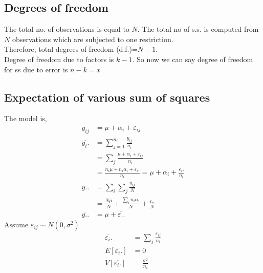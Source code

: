 \documentclass[oneside,11pt,pdftex]{book}%
\numberwithin{equation}{section}
\numberwithin{section}{chapter}
\numberwithin{equation}{chapter}
\begin{document}
\subsection{Degrees of freedom}
The total no. of observations is equal to $ N $. The total no of s.s. is computed from $ N $ observations which are subjected to one restriction.
\\
Therefore, total degrees of freedom (d.f.)=$ N-1 $.\\
Degree of freedom due to factors is $ k-1 $. So now we can say degree of freedom for ss due to error is $ n-k=x $

\subsection{Expectation of various sum of squares}
The model is,
\begin{align*}
	y_{ij}&= \mu + \alpha_i + \varepsilon_{ij}\\
	\overline{y_i.}&= \sum_{j=1}^{n_i}\frac{y_{ij}}{n_i}\\
	&= \sum_j \frac{\mu+\alpha_i + \varepsilon_{ij}}{n_i}\\
	&= \frac{n_i \mu + n_i \alpha_i +\varepsilon_{i}.}{n_i}=\mu + \alpha_i +\frac{\varepsilon_{i}.}{n_i}\\
	\overline{y..}&=\sum_i \sum_j \frac{y_{ij}}{N}\\
	&=\frac{N \mu }{N}+\frac{\sum_i n_i \alpha_i}{N}+\frac{\varepsilon..}{N}\\
	\overline{y..}&=\mu+\overline{\varepsilon..}
\end{align*}
Assume $ \varepsilon_{ij}\sim N(0,\sigma^2) $
\begin{align*}
	\overline{\varepsilon_i.}&=\sum_j  \frac{\varepsilon_{ij}}{n_i}\\
	E[\overline{\varepsilon_i.}]&=0\\
	V[\overline{\varepsilon_i.}]&=\frac{\sigma^2}{n_i}
\end{align*}
\end{document}

